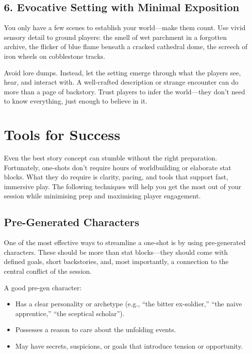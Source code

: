 \subsection*{6. Evocative Setting with Minimal Exposition}

You only have a few scenes to establish your world—make them count. Use vivid sensory detail to ground players: the smell of wet parchment in a forgotten archive, the flicker of blue flame beneath a cracked cathedral dome, the screech of iron wheels on cobblestone tracks.

Avoid lore dumps. Instead, let the setting emerge through what the players see, hear, and interact with. A well-crafted description or strange encounter can do more than a page of backstory. Trust players to infer the world—they don’t need to know everything, just enough to believe in it.





\section{Tools for Success}

Even the best story concept can stumble without the right preparation. Fortunately, one-shots don’t require hours of worldbuilding or elaborate stat blocks. What they do require is clarity, pacing, and tools that support fast, immersive play. The following techniques will help you get the most out of your session while minimising prep and maximising player engagement.

\subsection*{Pre-Generated Characters}

One of the most effective ways to streamline a one-shot is by using pre-generated characters. These should be more than stat blocks—they should come with defined goals, short backstories, and, most importantly, a connection to the central conflict of the session.

A good pre-gen character:
\begin{itemize}
    \item Has a clear personality or archetype (e.g., “the bitter ex-soldier,” “the naive apprentice,” “the sceptical scholar”).
    \item Possesses a reason to care about the unfolding events.
    \item May have secrets, suspicions, or goals that introduce tension or opportunity.
\end{itemize}

